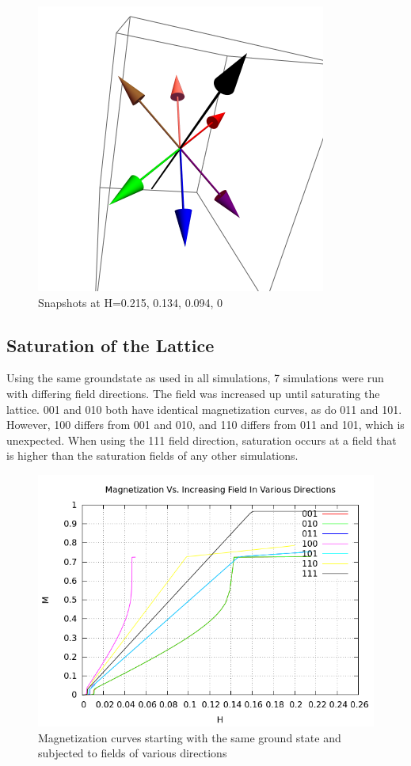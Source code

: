 \begin{figure}[ht]
\includegraphics[scale=0.37]{25june16/HVariedData/Pictures/011Dec216.png}
\caption{Snapshots at H=0.215, 0.134, 0.094, 0}
\end{figure}

\subsection{Saturation of the Lattice}
Using the same groundstate as used in all simulations, 7 simulations were run with differing field directions. The 
field was increased up until saturating the lattice. 001 and 010 both have identical magnetization curves, as do
011 and 101. However, 100 differs from 001 and 010, and 110 differs from 011 and 101, which is unexpected. When using
the 111 field direction, saturation occurs at a field that is higher than the saturation fields of any other simulations. 
\begin{figure}[ht]
 \centering
 \includegraphics[scale=0.6]{25june16/HVariedData/Increasing/IncreasingField.png}
 \caption{Magnetization curves starting with the same ground state and subjected to fields of various directions}
\end{figure}
\clearpage

